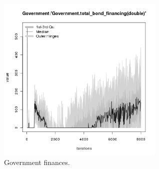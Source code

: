\begin{figure}[H!]
\begin{minipage}{17cm}
\includegraphics[width=8cm]{./benchmark_plots/Government-total_bond_financing.png}
\end{minipage}
\caption{Government finances.}
\label{Figure: Government}
\end{figure}
\clearpage

